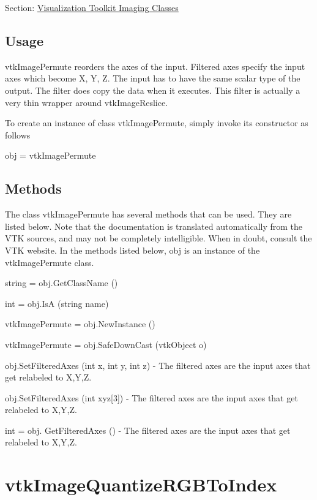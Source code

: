 Section\-: \hyperlink{sec_vtkimaging}{Visualization Toolkit Imaging Classes} \hypertarget{vtkwidgets_vtkxyplotwidget_Usage}{}\subsection{Usage}\label{vtkwidgets_vtkxyplotwidget_Usage}
vtk\-Image\-Permute reorders the axes of the input. Filtered axes specify the input axes which become X, Y, Z. The input has to have the same scalar type of the output. The filter does copy the data when it executes. This filter is actually a very thin wrapper around vtk\-Image\-Reslice.

To create an instance of class vtk\-Image\-Permute, simply invoke its constructor as follows \begin{DoxyVerb}  obj = vtkImagePermute
\end{DoxyVerb}
 \hypertarget{vtkwidgets_vtkxyplotwidget_Methods}{}\subsection{Methods}\label{vtkwidgets_vtkxyplotwidget_Methods}
The class vtk\-Image\-Permute has several methods that can be used. They are listed below. Note that the documentation is translated automatically from the V\-T\-K sources, and may not be completely intelligible. When in doubt, consult the V\-T\-K website. In the methods listed below, {\ttfamily obj} is an instance of the vtk\-Image\-Permute class. 
\begin{DoxyItemize}
\item {\ttfamily string = obj.\-Get\-Class\-Name ()}  
\item {\ttfamily int = obj.\-Is\-A (string name)}  
\item {\ttfamily vtk\-Image\-Permute = obj.\-New\-Instance ()}  
\item {\ttfamily vtk\-Image\-Permute = obj.\-Safe\-Down\-Cast (vtk\-Object o)}  
\item {\ttfamily obj.\-Set\-Filtered\-Axes (int x, int y, int z)} -\/ The filtered axes are the input axes that get relabeled to X,Y,Z.  
\item {\ttfamily obj.\-Set\-Filtered\-Axes (int xyz\mbox{[}3\mbox{]})} -\/ The filtered axes are the input axes that get relabeled to X,Y,Z.  
\item {\ttfamily int = obj. Get\-Filtered\-Axes ()} -\/ The filtered axes are the input axes that get relabeled to X,Y,Z.  
\end{DoxyItemize}\hypertarget{vtkimaging_vtkimagequantizergbtoindex}{}\section{vtk\-Image\-Quantize\-R\-G\-B\-To\-Index}\label{vtkimaging_vtkimagequantizergbtoindex}
